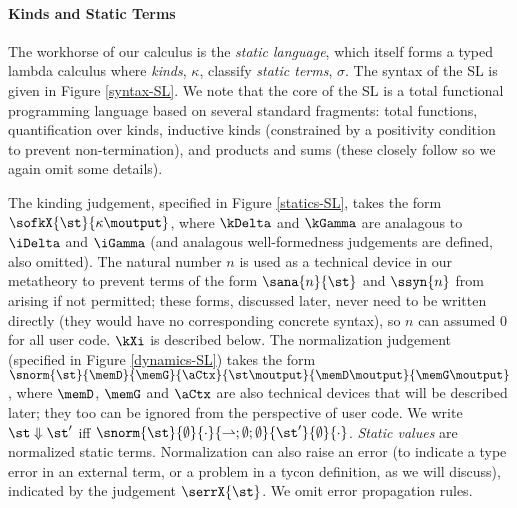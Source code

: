 \paragraph{Kinds and Static Terms}
The workhorse of our calculus is the \emph{static language}, which itself forms a typed lambda calculus where 
\emph{kinds}, $\kappa$, classify \emph{static terms}, $\sigma$.  The syntax of the SL is given in Figure \ref{syntax-SL}. We note that the core of the SL is a total functional programming language based on several standard fragments: total functions, quantification over kinds, inductive kinds (constrained by a positivity condition to prevent non-termination), and products and sums (these closely follow \cite{pfpl} so we again omit some details). 

The kinding judgement, specified  in Figure \ref{statics-SL}, takes the form $\sofkX{\st}{\kappa\moutput}$, where $\kDelta$ and $\kGamma$ are analagous to $\iDelta$ and $\iGamma$ (and analagous well-formedness judgements are defined, also omitted). The natural number $n$ is used as a technical device in our metatheory to prevent terms of the form $\sana{n}{\st}$ and $\ssyn{n}$ from arising if not permitted; these forms, discussed later, never need to be written directly (they would have no corresponding concrete syntax), so $n$ can assumed 0 for all user code. $\kXi$ is described below. The normalization judgement (specified in Figure \ref{dynamics-SL}) takes the form $\snorm{\st}{\memD}{\memG}{\aCtx}{\st\moutput}{\memD\moutput}{\memG\moutput}$, where $\memD$, $\memG$ and $\aCtx$ are also technical devices that will be described later; they too can be ignored from the perspective of user code. We write $\st \Downarrow \st'$ iff $\snorm{\st}{\emptyset}{\cdot}{{\rightharpoonup}; \emptyset; \emptyset}{\st'}{\emptyset}{\cdot}$. \emph{Static values} are normalized static terms. Normalization can also raise an error (to indicate a type error in an external term, or a problem in a tycon definition, as we will discuss), indicated by the judgement $\serrX{\st}$. We omit error propagation rules.%


